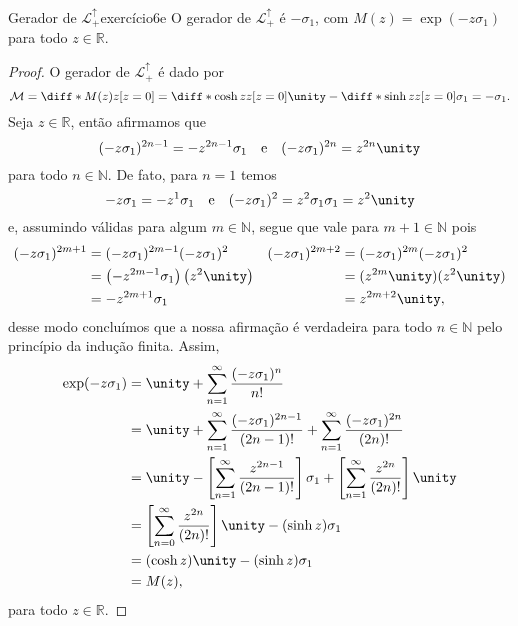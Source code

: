\begin{proposition}{Gerador de \(\mathcal{L}_+^\uparrow\)}{exercício6e}
    O gerador de \(\mathcal{L}_+^\uparrow\) é \(-\sigma_1\), com \(M(z) = \exp(-z \sigma_1)\) para todo \(z \in \mathbb{R}\).
\end{proposition}
\begin{proof}
    O gerador de \(\mathcal{L}_+^\uparrow\) é dado por
    \begin{equation*}
        \mathcal{M} = \diff*{M(z)}{z}[z=0] = \diff*{\cosh{z}}{z}[z=0]\unity - \diff*{\sinh{z}}{z}[z=0]\sigma_1 = -\sigma_1.
    \end{equation*}
    Seja \(z \in \mathbb{R}\), então afirmamos que
    \begin{equation*}
        (-z \sigma_1)^{2n-1} = -z^{2n-1} \sigma_1\quad\text{e}\quad (-z \sigma_1)^{2n} = z^{2n} \unity
    \end{equation*}
    para todo \(n \in \mathbb{N}\). De fato, para \(n = 1\) temos
    \begin{equation*}
        -z \sigma_1 = -z^1 \sigma_1\quad\text{e}\quad (-z \sigma_1)^2 = z^2 \sigma_1 \sigma_1 = z^2 \unity
    \end{equation*}
    e, assumindo válidas para algum \(m \in \mathbb{N}\), segue que vale para \(m + 1 \in \mathbb{N}\) pois
    \begin{align*}
        (-z \sigma_1)^{2m+1} &= (-z \sigma_1)^{2m-1} (-z \sigma_1)^2&
        (-z \sigma_1)^{2m+2} &= (-z \sigma_1)^{2m}(-z \sigma_1)^2\\
                             &= \left(-z^{2m - 1} \sigma_1\right) \left(z^2 \unity\right)&
                             &= (z^{2m} \unity)(z^2\unity)\\
                             &= -z^{2m+1} \sigma_1&
                             &= z^{2m+2} \unity,
    \end{align*}
    desse modo concluímos que a nossa afirmação é verdadeira para todo \(n \in \mathbb{N}\) pelo princípio da indução finita. Assim,
    \begin{align*}
        \exp(- z \sigma_1) &= \unity + \sum_{n = 1}^\infty \frac{(-z \sigma_1)^n}{n!}\\
        &= \unity + \sum_{n = 1}^\infty\frac{(-z \sigma_1)^{2n - 1}}{(2n - 1)!} + \sum_{n = 1}^\infty \frac{(-z \sigma_1)^{2n}}{(2n)!}\\
        &= \unity - \left[\sum_{n = 1}^\infty\frac{z^{2n-1}}{(2n - 1)!}\right]\sigma_1 + \left[\sum_{n = 1}^\infty \frac{z^{2n}}{(2n)!}\right]\unity\\
        &= \left[\sum_{n = 0}^\infty \frac{z^{2n}}{(2n)!}\right]\unity - (\sinh{z})\sigma_1\\
        &=(\cosh{z})\unity - (\sinh{z}) \sigma_1\\
        &= M(z),
    \end{align*}
    para todo \(z \in \mathbb{R}\).
\end{proof}

